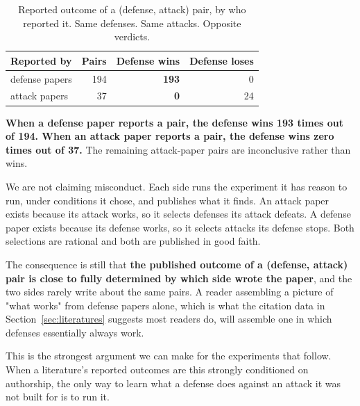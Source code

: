\begin{table}[t]
\caption{Reported outcome of a (defense, attack) pair, by who reported it.
Same defenses. Same attacks. Opposite verdicts.}
\label{tab:whoran}
\small
\begin{tabular}{@{}lrrr@{}}
\toprule
\textbf{Reported by} & \textbf{Pairs} & \textbf{Defense wins} &
\textbf{Defense loses} \\
\midrule
defense papers & 194 & \textbf{193} & 0 \\
attack papers  &  37 & \textbf{0}   & 24 \\
\bottomrule
\end{tabular}
\end{table}

\textbf{When a defense paper reports a pair, the defense wins 193 times out of
194. When an attack paper reports a pair, the defense wins zero times out of
37.} The remaining attack-paper pairs are inconclusive rather than wins.

We are not claiming misconduct. Each side runs the experiment it has reason to
run, under conditions it chose, and publishes what it finds. An attack paper
exists because its attack works, so it selects defenses its attack defeats. A
defense paper exists because its defense works, so it selects attacks its
defense stops. Both selections are rational and both are published in good
faith.

The consequence is still that \textbf{the published outcome of a
(defense, attack) pair is close to fully determined by which side wrote the
paper}, and the two sides rarely write about the same pairs. A reader
assembling a picture of "what works" from defense papers alone, which is what
the citation data in Section~\ref{sec:literatures} suggests most readers do,
will assemble one in which defenses essentially always work.

This is the strongest argument we can make for the experiments that follow.
When a literature's reported outcomes are this strongly conditioned on
authorship, the only way to learn what a defense does against an attack it was
not built for is to run it.

